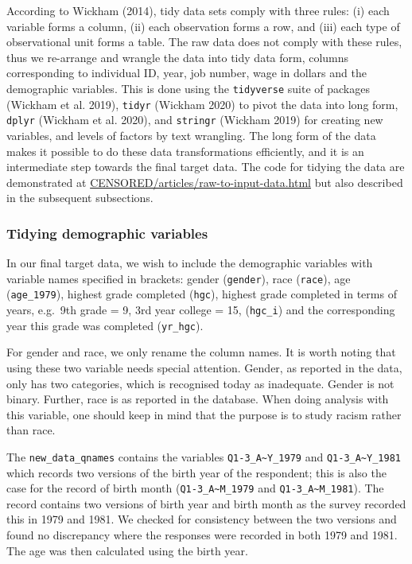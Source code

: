 \documentclass{article}
\begin{document}
According to Wickham (2014), tidy data sets comply with three rules: (i) each variable forms a column, (ii) each observation forms a row, and (iii) each type of observational unit forms a table. The raw data does not comply with these rules, thus we re-arrange and wrangle the data into tidy data form, columns corresponding to individual ID, year, job number, wage in dollars and the demographic variables. This is done using the \texttt{tidyverse} suite of packages (Wickham et al. 2019), \texttt{tidyr} (Wickham 2020) to pivot the data into long form, \texttt{dplyr} (Wickham et al. 2020), and \texttt{stringr} (Wickham 2019) for creating new variables, and levels of factors by text wrangling. The long form of the data makes it possible to do these data transformations efficiently, and it is an intermediate step towards the final target data. The code for tidying the data are demonstrated at \url{CENSORED/articles/raw-to-input-data.html} but also described in the subsequent subsections.

\hypertarget{tidydemog}{%
\subsubsection{Tidying demographic variables}\label{tidydemog}}

In our final target data, we wish to include the demographic variables with variable names specified in brackets: gender (\texttt{gender}), race (\texttt{race}), age (\texttt{age\_1979}), highest grade completed (\texttt{hgc}), highest grade completed in terms of years, e.g.~9th grade = 9, 3rd year college = 15, (\texttt{hgc\_i}) and the corresponding year this grade was completed (\texttt{yr\_hgc}).

For gender and race, we only rename the column names. It is worth noting that using these two variable needs special attention. Gender, as reported in the data, only has two categories, which is recognised today as inadequate. Gender is not binary. Further, race is as reported in the database. When doing analysis with this variable, one should keep in mind that the purpose is to study racism rather than race.

The \texttt{new\_data\_qnames} contains the variables \texttt{Q1-3\_A\textasciitilde{}Y\_1979} and \texttt{Q1-3\_A\textasciitilde{}Y\_1981} which records two versions of the birth year of the respondent; this is also the case for the record of birth month (\texttt{Q1-3\_A\textasciitilde{}M\_1979} and \texttt{Q1-3\_A\textasciitilde{}M\_1981}). The record contains two versions of birth year and birth month as the survey recorded this in 1979 and 1981. We checked for consistency between the two versions and found no discrepancy where the responses were recorded in both 1979 and 1981. The age was then calculated using the birth year.
\end{document}
